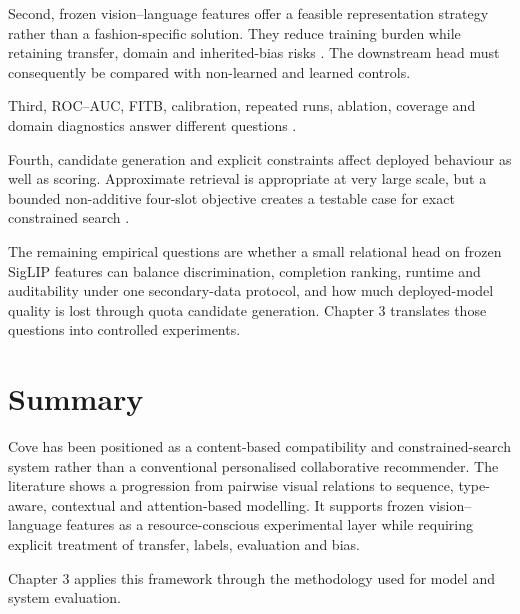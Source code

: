 Second, frozen vision--language features offer a feasible representation
strategy rather than a fashion-specific solution. They reduce training burden
while retaining transfer, domain and inherited-bias risks
\parencite{radford2021clip,zhai2023siglip,kornblith2019transfer}. The downstream
head must consequently be compared with non-learned and learned controls.

Third, ROC--AUC, FITB, calibration, repeated runs, ablation, coverage and domain
diagnostics answer different questions
\parencite{fawcett2006roc,guo2017calibration,bouthillier2021variance}.

Fourth, candidate generation and explicit constraints affect deployed
behaviour as well as scoring. Approximate retrieval is appropriate at very
large scale, but a bounded non-additive four-slot objective creates a testable
case for exact constrained search
\parencite{sarkar2023outfittransformer,johnson2021similarity}.

The remaining empirical questions are whether a small relational head on
frozen SigLIP features can balance discrimination, completion ranking, runtime
and auditability under one secondary-data protocol, and how much deployed-model
quality is lost through quota candidate generation. Chapter 3 translates those
questions into controlled experiments.

\section{Summary}

Cove has been positioned as a content-based compatibility and constrained-search
system rather than a conventional personalised collaborative recommender. The
literature shows a progression from pairwise visual relations to sequence,
type-aware, contextual and attention-based modelling. It supports frozen
vision--language features as a resource-conscious experimental layer while
requiring explicit treatment of transfer, labels, evaluation and bias.

Chapter 3 applies this framework through the methodology used for model and
system evaluation.
